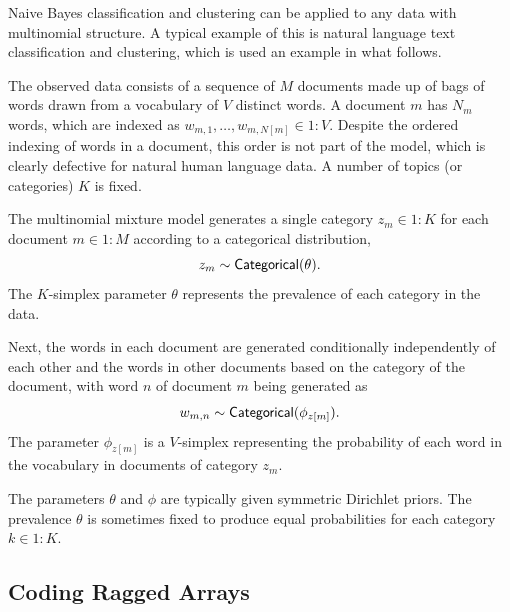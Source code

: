 Naive Bayes classification and clustering can be applied to any data
with multinomial structure.  A typical example of this is natural
language text classification and clustering, which is used an example
in what follows. 

The observed data consists of a sequence of $M$ documents made up of
bags of words drawn from a vocabulary of $V$ distinct words.  A
document $m$ has $N_m$ words, which are indexed as $w_{m,1}, \ldots,
w_{m,N[m]} \in 1{:}V$.  Despite the ordered indexing of words in a
document, this order is not part of the model, which is clearly
defective for natural human language data.  A number of topics (or
categories) $K$ is fixed.

The multinomial mixture model generates a single category $z_m \in
1{:}K$ for each document $m \in 1{:}M$ according to a categorical
distribution,
\[
z_m \sim \distro{Categorical}(\theta).
\]
The $K$-simplex parameter $\theta$ represents the prevalence of each
category in the data.  

Next, the words in each document are generated conditionally
independently of each other and the words in other documents based on
the category of the document, with word $n$ of document $m$ being
generated as
\[
w_{m,n} \sim \distro{Categorical}(\phi_{z[m]}).
\]
The parameter $\phi_{z[m]}$ is a $V$-simplex representing the
probability of each word in the vocabulary in documents of category
$z_m$.

The parameters $\theta$ and $\phi$ are typically given symmetric
Dirichlet priors.  The prevalence $\theta$ is sometimes fixed to
produce equal probabilities for each category $k \in 1:K$.

\subsection{Coding Ragged Arrays}

